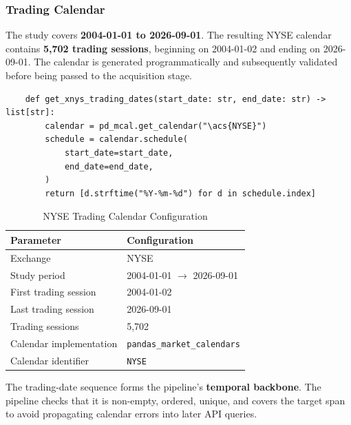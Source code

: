 \subsubsection*{Trading Calendar}
The study covers \textbf{2004-01-01 to 2026-09-01}. The resulting \acs{NYSE} calendar contains \textbf{5,702 trading sessions}, beginning on 2004-01-02 and ending on 2026-09-01. The calendar is generated programmatically and subsequently validated before being passed to the acquisition stage.
\begin{verbatim}
    def get_xnys_trading_dates(start_date: str, end_date: str) -> list[str]:
        calendar = pd_mcal.get_calendar("\acs{NYSE}")
        schedule = calendar.schedule(
            start_date=start_date,
            end_date=end_date,
        )
        return [d.strftime("%Y-%m-%d") for d in schedule.index]
\end{verbatim}
\begin{table}[h]
    \centering
    \small
    \begin{tabular}{l|l}
        \toprule
        \textbf{Parameter}      & \textbf{Configuration}              \\
        \hline
        Exchange                & \acs{NYSE}                          \\
        Study period            & 2004-01-01 $\rightarrow$ 2026-09-01 \\
        First trading session   & 2004-01-02                          \\
        Last trading session    & 2026-09-01                          \\
        Trading sessions        & 5,702                               \\
        Calendar implementation & \texttt{pandas\_market\_calendars}  \\
        Calendar identifier     & \texttt{\acs{NYSE}}                 \\
        \bottomrule
    \end{tabular}
    \caption{\acs{NYSE} Trading Calendar Configuration}
\end{table}
The trading-date sequence forms the pipeline's \textbf{temporal backbone}. The pipeline checks that it is non-empty, ordered, unique, and covers the target span to avoid propagating calendar errors into later \acs{API} queries.


